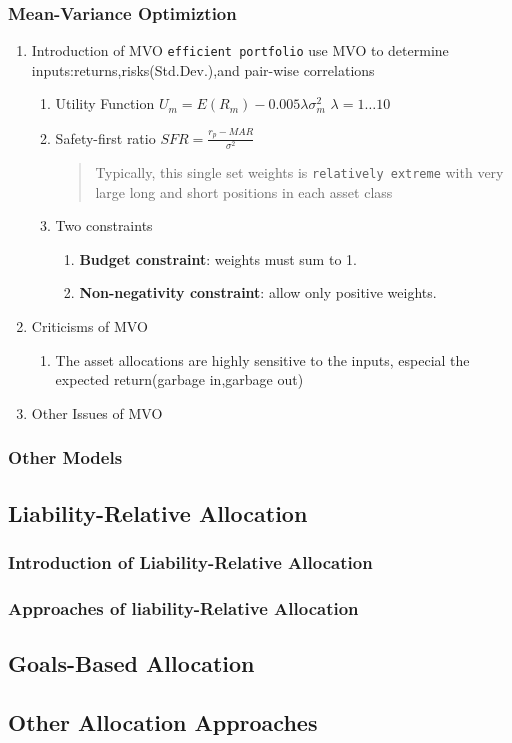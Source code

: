 \documentclass[12pt,a4paper]{article}
\begin{document}
\subsubsection{Mean-Variance Optimiztion}
\label{sec:org1dfc579}
\begin{enumerate}
\item Introduction of MVO
\label{sec:org912d7aa}
\texttt{efficient portfolio} use MVO to determine
inputs:returns,risks(Std.Dev.),and pair-wise correlations
\begin{enumerate}
\item Utility Function
\label{sec:orgcd3b9c0}
\(U_{m}=E(R_{m})-0.005\lambda \sigma^{2}_{m}\)
\(\lambda=1\dots10\)
\item Safety-first ratio
\label{sec:org1b3e102}
\(SFR=\frac{r_{p}-MAR}{\sigma^{2}}\)
\begin{quote}
Typically, this single set weights is \texttt{relatively extreme} with very large long and short positions in each asset class
\end{quote}
\item Two constraints
\label{sec:org3a01eba}
\begin{enumerate}
\item \textbf{Budget constraint}: weights must sum to 1.
\item \textbf{Non-negativity constraint}: allow only positive weights.
\end{enumerate}
\end{enumerate}
\item Criticisms of MVO
\label{sec:org9f59e8e}
\begin{enumerate}
\item The asset allocations are highly sensitive to the inputs, especial the expected return(garbage in,garbage out)
\end{enumerate}
\item Other Issues of MVO
\label{sec:org72be8ff}
\end{enumerate}
\subsubsection{Other Models}
\label{sec:org2567323}
\subsection{Liability-Relative Allocation}
\label{sec:org071c559}
\subsubsection{Introduction of Liability-Relative Allocation}
\label{sec:orga0853e9}
\subsubsection{Approaches of liability-Relative Allocation}
\label{sec:org5855434}
\subsection{Goals-Based Allocation}
\label{sec:org353e0a4}
\subsection{Other Allocation Approaches}
\label{sec:orge759c77}
\end{document}
